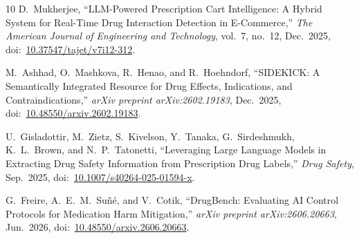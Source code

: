 \documentclass[conference]{IEEEtran}
\begin{document}
\begin{thebibliography}{10}
D.~Mukherjee,
``LLM-Powered Prescription Cart Intelligence: A Hybrid System for Real-Time
Drug Interaction Detection in E-Commerce,''
\textit{The American Journal of Engineering and Technology}, vol.~7, no.~12,
Dec.~2025,
doi:~\href{https://doi.org/10.37547/tajet/v7i12-312}{10.37547/tajet/v7i12-312}.

M.~Ashhad, O.~Mashkova, R.~Henao, and R.~Hoehndorf,
``SIDEKICK: A Semantically Integrated Resource for Drug Effects, Indications,
and Contraindications,''
\textit{arXiv preprint arXiv:2602.19183}, Dec.~2025,
doi:~\href{https://doi.org/10.48550/arxiv.2602.19183}{10.48550/arxiv.2602.19183}.

U.~Gisladottir, M.~Zietz, S.~Kivelson, Y.~Tanaka, G.~Sirdeshmukh,
K.~L.~Brown, and N.~P.~Tatonetti,
``Leveraging Large Language Models in Extracting Drug Safety Information from
Prescription Drug Labels,''
\textit{Drug Safety}, Sep.~2025,
doi:~\href{https://doi.org/10.1007/s40264-025-01594-x}{10.1007/s40264-025-01594-x}.

G.~Freire, A.~E.~M.~Su\~{n}\'{e}, and V.~Cotik,
``DrugBench: Evaluating AI Control Protocols for Medication Harm Mitigation,''
\textit{arXiv preprint arXiv:2606.20663}, Jun.~2026,
doi:~\href{https://doi.org/10.48550/arxiv.2606.20663}{10.48550/arxiv.2606.20663}.

\end{thebibliography}
\end{document}
